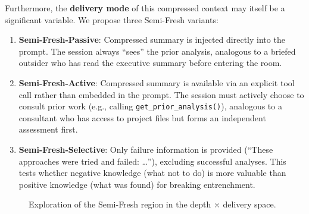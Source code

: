 \documentclass[11pt]{article}
\begin{document}
Furthermore, the \textbf{delivery mode} of this compressed context may itself be a significant variable. We propose three Semi-Fresh variants:

\begin{enumerate}[label=\arabic*., leftmargin=1.5em]
  \item \textbf{Semi-Fresh-Passive}: Compressed summary is injected directly into the prompt. The session always ``sees'' the prior analysis, analogous to a briefed outsider who has read the executive summary before entering the room.
  \item \textbf{Semi-Fresh-Active}: Compressed summary is available via an explicit tool call rather than embedded in the prompt. The session must actively choose to consult prior work (e.g., calling \texttt{get\_prior\_analysis()}), analogous to a consultant who has access to project files but forms an independent assessment first.
  \item \textbf{Semi-Fresh-Selective}: Only failure information is provided (``These approaches were tried and failed: \ldots''), excluding successful analyses. This tests whether negative knowledge (what not to do) is more valuable than positive knowledge (what was found) for breaking entrenchment.
\end{enumerate}

\begin{figure}[t]
\centering
{}
\caption{Exploration of the Semi-Fresh region in the depth $\times$ delivery space.}
\label{fig:semifresh}
\end{figure}
\end{document}
